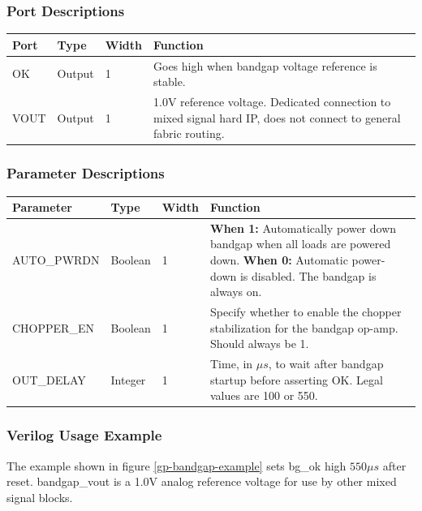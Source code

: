 \documentclass[11pt]{article}
\begin{document}
\subsubsection{Port Descriptions}

\begin{tabularx}{5in}{|l|l|l|X|}
\hline
{\bfseries Port} & {\bfseries Type} & {\bfseries Width} & {\bfseries Function} \\
\hline
OK & Output & 1 & Goes high when bandgap voltage reference is stable. \\
\hline
VOUT & Output & 1 & 1.0V reference voltage.
	Dedicated connection to mixed signal hard IP, does not connect to general fabric routing. \\
\hline
\end{tabularx}

\subsubsection{Parameter Descriptions}

\begin{tabularx}{5in}{|l|l|l|X|}
\hline
{\bfseries Parameter} & {\bfseries Type} & {\bfseries Width} & {\bfseries Function} \\
\hline
AUTO\_PWRDN & Boolean & 1 &
	{\bfseries When 1: } \newline Automatically power down bandgap when all loads are powered down. \newline
	{\bfseries When 0: } \newline Automatic power-down is disabled. The bandgap is always on.\\
\hline
CHOPPER\_EN & Boolean & 1 &
	Specify whether to enable the chopper stabilization for the bandgap op-amp. Should always be 1. \\
\hline
OUT\_DELAY & Integer & 1 &
	Time, in $\mu s$, to wait after bandgap startup before asserting OK. Legal values are 100 or 550.\\
\hline
\end{tabularx}

\subsubsection{Verilog Usage Example}

The example shown in figure \ref{gp-bandgap-example} sets bg\_ok high $550 \mu s$ after reset. bandgap\_vout is a 1.0V 
analog reference voltage for use by other mixed signal blocks.
\end{document}

